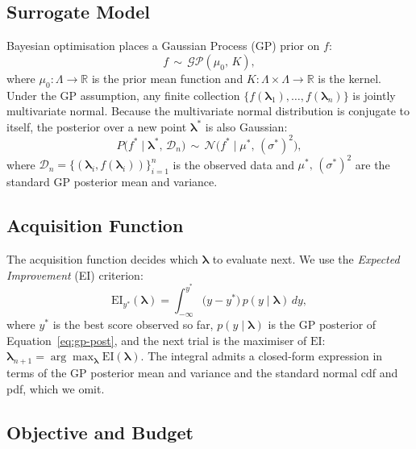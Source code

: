\subsection{Surrogate Model}

Bayesian optimisation places a Gaussian Process (GP) prior on $f$:
\begin{equation}
f \,\sim\, \mathcal{GP}(\mu_0,\,K),
\tag{3.3}
\label{eq:gp-prior}
\end{equation}
where $\mu_0:\Lambda\to\mathbb{R}$ is the prior mean function and
$K:\Lambda\times\Lambda\to\mathbb{R}$ is the kernel. Under the GP
assumption, any finite collection
$\{f(\boldsymbol{\lambda}_1),\ldots,f(\boldsymbol{\lambda}_n)\}$
is jointly multivariate normal. Because the multivariate normal
distribution is conjugate to itself, the posterior over a new
point $\boldsymbol{\lambda}^{*}$ is also Gaussian:
\begin{equation}
P\bigl(f^{*}\mid \boldsymbol{\lambda}^{*},\,\mathcal{D}_{n}\bigr)
\,\sim\,
\mathcal{N}\bigl(f^{*}\mid \mu^{*},\,(\sigma^{*})^{2}\bigr),
\tag{3.4}
\label{eq:gp-post}
\end{equation}
where $\mathcal{D}_n=\{(\boldsymbol{\lambda}_i,f(\boldsymbol{\lambda}_i))\}_{i=1}^{n}$
is the observed data and $\mu^{*},\,(\sigma^{*})^{2}$ are the
standard GP posterior mean and variance.

\subsection{Acquisition Function}

The acquisition function decides which $\boldsymbol{\lambda}$ to
evaluate next. We use the \emph{Expected Improvement} (EI) criterion:
\begin{equation}
\mathrm{EI}_{y^{*}}(\boldsymbol{\lambda})
=
\int_{-\infty}^{y^{*}}
\bigl(y - y^{*}\bigr)\,p(y\mid\boldsymbol{\lambda})\,dy,
\tag{3.5}
\label{eq:ei}
\end{equation}
where $y^{*}$ is the best score observed so far,
$p(y\mid\boldsymbol{\lambda})$ is the GP posterior of
Equation~\eqref{eq:gp-post}, and the next trial is the maximiser of
$\mathrm{EI}$:
$\boldsymbol{\lambda}_{n+1}=\arg\max_{\boldsymbol{\lambda}}\mathrm{EI}(\boldsymbol{\lambda})$.
The integral admits a closed-form expression in terms of the GP
posterior mean and variance and the standard normal cdf and pdf,
which we omit.

\subsection{Objective and Budget}

